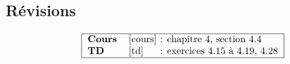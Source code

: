 \subsection{Révisions}

$$\begin{tabular}{|ll@{ : }l|}
\hline
\textbf{Cours} & \cite{cours} & chapitre 4, section 4.4 \\
\textbf{TD}    & \cite{td}    & exercices 4.15 à 4.19, 4.28 \\
\hline
\end{tabular}$$
